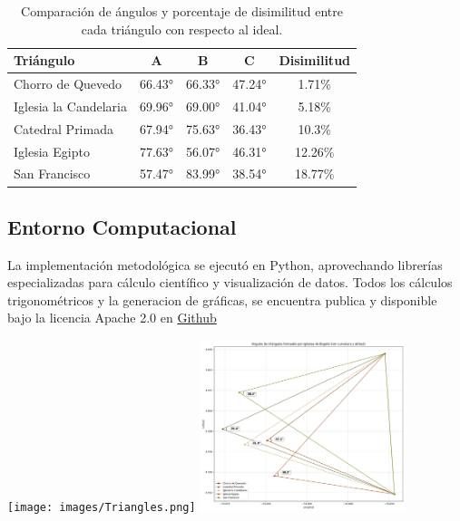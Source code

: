 \documentclass[a4paper,alpha-refs]{eSpectra}
\begin{document}
\begin{table}[h!]
\centering
\begin{tabular}{|l|c|c|c|c|}
\hline
\textbf{Triángulo} & \textbf{A} & \textbf{B} & \textbf{C} & \textbf{Disimilitud} \\ \hline
Chorro de Quevedo & 66.43° & 66.33° & 47.24° & 1.71\% \\ \hline
Iglesia la Candelaria & 69.96° & 69.00° & 41.04° & 5.18\% \\ \hline
Catedral Primada & 67.94° & 75.63° & 36.43° & 10.3\% \\ \hline
Iglesia Egipto & 77.63° & 56.07° & 46.31° & 12.26\% \\ \hline
San Francisco & 57.47° & 83.99° & 38.54° & 18.77\% \\ \hline
\end{tabular}
\caption{Comparación de ángulos y porcentaje de disimilitud entre cada triángulo con respecto al ideal.}
\end{table}
\vspace{-\baselineskip}  %
\vspace{-0.5\baselineskip}  %

\subsection{Entorno Computacional}
La implementación metodológica se ejecutó en Python, aprovechando librerías especializadas para cálculo científico y visualización de datos. Todos los cálculos trigonométricos y la generacion de gráficas, se encuentra publica y disponible bajo la licencia Apache 2.0 en \href{https://github.com/Usuy-Leon/El-secreto-astronomico-de-Guadalupe-Monserrate}{Github}

\centering
   \texttt{[image: images/Triangles.png]}
   \includegraphics[width=0.45\textwidth]{images/triangles_with_arcs.png}
\end{document}
